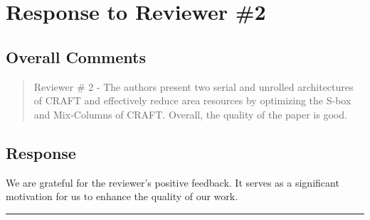 \section{Response to Reviewer \#2}
\subsection*{Overall Comments}
\begin{mdframed}
\begin{quote}
	 Reviewer \# 2 - The authors present two serial and unrolled architectures of CRAFT and effectively reduce area resources by optimizing the S-box and Mix-Columns of CRAFT. Overall, the quality of the paper is good.
\end{quote}
\end{mdframed}

\subsection{Response} 

We are grateful for the reviewer's positive feedback. It serves as a significant motivation for us to enhance the quality of our work.

\noindent\rule{17cm}{6.0pt}